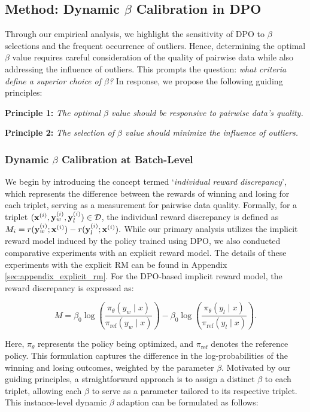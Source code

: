 \subsection{Method: Dynamic $\beta$ Calibration in DPO}

Through our empirical analysis, we highlight the sensitivity of DPO to $\beta$ selections and the frequent occurrence of outliers. Hence, 
determining the optimal $\beta$ value requires careful consideration of the quality of pairwise data while also addressing the influence of outliers. This prompts the question: \textit{what criteria define a superior choice of $\beta$?} In response, we propose the following guiding principles:

\textbf{Principle 1:} \textit{The optimal $\beta$ value should be responsive to pairwise data's quality.}

\textbf{Principle 2:} \textit{The selection of $\beta$ value should minimize the influence of outliers.}

\subsubsection{Dynamic $\beta$ Calibration at Batch-Level}
We begin by introducing the concept termed `\textit{individual reward discrepancy}', which represents the difference between the rewards of winning and losing for each triplet, serving as a measurement for pairwise data quality. Formally, for a triplet $(\mathbf{x}^{(i)}, \mathbf{y}_w^{(i)}, \mathbf{y}_l^{(i)}) \in \mathcal{D}$, the individual reward discrepancy is defined as 
$M_i = r(\mathbf{y}_w^{(i)};\mathbf{x}^{(i)}) - r(\mathbf{y}_l^{(i)};\mathbf{x}^{(i)}).$
While our primary analysis utilizes the implicit reward model induced by the policy trained using DPO, we also conducted comparative experiments with an explicit reward model. The details of these experiments with the explicit RM can be found in Appendix \ref{sec:appendix_explicit_rm}. For the DPO-based implicit reward model, the reward discrepancy is expressed as:

$$ M = \beta_0 \log \left( \frac{\pi_\theta (y_w \mid x) }{\pi_{\text{ref}}(y_w \mid x)} \right) - \beta_0 \log \left( \frac{\pi_\theta (y_l \mid x) }{\pi_{\text{ref}}(y_l \mid x)} \right). $$

Here, \(\pi_\theta\) represents the policy being optimized, and \(\pi_{\text{ref}}\) denotes the reference policy. This formulation captures the difference in the log-probabilities of the winning and losing outcomes, weighted by the parameter \(\beta\).
Motivated by our guiding principles, a straightforward approach is to assign a distinct $\beta$ to each triplet, allowing each $\beta$ to serve as a parameter tailored to its respective triplet. This instance-level dynamic $\beta$ adaption can be formulated as follows:


